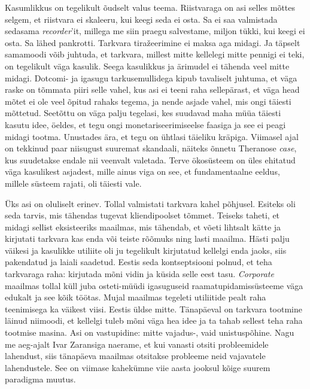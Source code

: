 
Kasumlikkus on tegelikult õudselt valus teema. Riistvaraga on  
asi selles mõttes selgem, et riistvara ei skaleeru, kui keegi seda ei osta. Sa 
ei 
saa valmistada sedasama \emph{recorder}'it, millega me siin praegu salvestame, 
miljon tükki, kui keegi ei osta. Sa lähed 
pankrotti. Tarkvara tiražeerimine ei maksa aga midagi. Ja täpselt samamoodi 
võib  
juhtuda, et tarkvara, millest mitte kellelegi mitte pennigi ei teki, on 
tegelikult väga kasulik. Seega kasulikkus ja ärimudel ei tähenda veel mitte 
midagi. Dotcomi- ja igasugu tarkusemullidega kipub tavaliselt juhtuma, et väga 
raske on tõmmata piiri selle vahel, kus asi ei teeni 
raha sellepärast, et väga head mõtet ei ole veel õpitud rahaks  
tegema, ja nende asjade vahel, mis ongi täiesti mõttetud. 
Seetõttu on väga palju tegelasi, kes suudavad maha müüa täiesti kasutu idee, 
öeldes, et tegu ongi monetariseerimiseelse faasiga ja see ei peagi midagi 
tootma. 
Unustades ära, et tegu on ühtlasi täieliku kräpiga. 
Viimasel ajal on tekkinud paar niisugust suuremat skandaali, näiteks
õnnetu Theranose \emph{case}, kus suudetakse endale nii veenvalt 
valetada. Terve ökosüsteem on üles ehitatud väga kasulikest 
asjadest, mille ainus viga on see, et fundamentaalne eeldus, millele süsteem 
rajati, oli täiesti vale. 


Üks asi on oluliselt erinev. Tollal valmistati tarkvara kahel põhjusel. 
Esiteks oli seda tarvis, mis tähendas tugevat kliendipoolset 
tõmmet. Teiseks taheti, et midagi sellist eksisteeriks 
maailmas, mis tähendab, et võeti lihtsalt kätte ja kirjutati tarkvara kas enda 
või teiste rõõmuks ning lasti maailma. Hästi palju väikesi ja 
kasulikke 
utiliite oli ju tegelikult kirjutatud kellelgi 
enda jaoks, siis pakendatud ja laiali saadetud. Eestis seda kontseptsiooni 
polnud, et teha tarkvaraga 
raha: kirjutada mõni vidin ja küsida selle eest tasu. \emph{Corporate} maailmas 
tollal 
küll juba osteti-müüdi igasuguseid raamatupidamissüsteeme väga 
edukalt ja see kõik töötas. Mujal maailmas tegeleti utiliitide 
pealt raha teenimisega ka väikest viisi. Eestis üldse mitte. Tänapäeval on 
tarkvara tootmine läinud niimoodi, et kellelgi tuleb mõni väga
hea idee ja ta tahab sellest teha raha tootmise masina. Asi on vastupidine: 
mitte 
vajadus-, vaid unistuspõhine. Nagu me 
aeg-ajalt Ivar Zaransiga naerame, et kui vanasti 
otsiti probleemidele lahendust, siis tänapäeva 
maailmas otsitakse probleeme neid vajavatele lahendustele. See on viimase 
kahekümne viie aasta jooksul kõige suurem paradigma muutus.